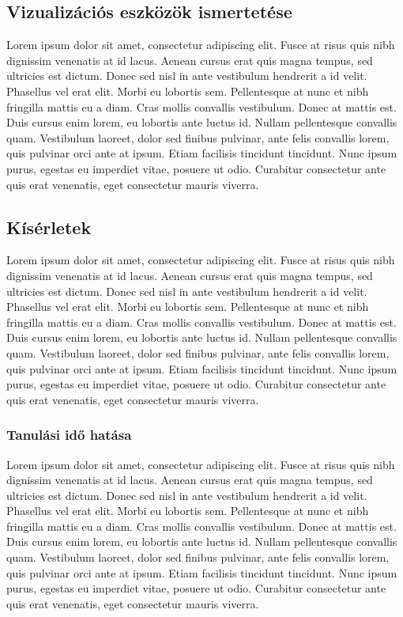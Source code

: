 \documentclass[12pt]{article}
\begin{document}
\subsection{Vizualizációs eszközök ismertetése}

Lorem ipsum dolor sit amet, consectetur adipiscing elit. Fusce at risus quis nibh dignissim venenatis at id lacus. Aenean cursus erat quis magna tempus, sed ultricies est dictum. Donec sed nisl in ante vestibulum hendrerit a id velit. Phasellus vel erat elit. Morbi eu lobortis sem. Pellentesque at nunc et nibh fringilla mattis eu a diam. Cras mollis convallis vestibulum. Donec at mattis est. Duis cursus enim lorem, eu lobortis ante luctus id. Nullam pellentesque convallis quam. Vestibulum laoreet, dolor sed finibus pulvinar, ante felis convallis lorem, quis pulvinar orci ante at ipsum. Etiam facilisis tincidunt tincidunt. Nunc ipsum purus, egestas eu imperdiet vitae, posuere ut odio. Curabitur consectetur ante quis erat venenatis, eget consectetur mauris viverra.

\subsection{Kísérletek}

Lorem ipsum dolor sit amet, consectetur adipiscing elit. Fusce at risus quis nibh dignissim venenatis at id lacus. Aenean cursus erat quis magna tempus, sed ultricies est dictum. Donec sed nisl in ante vestibulum hendrerit a id velit. Phasellus vel erat elit. Morbi eu lobortis sem. Pellentesque at nunc et nibh fringilla mattis eu a diam. Cras mollis convallis vestibulum. Donec at mattis est. Duis cursus enim lorem, eu lobortis ante luctus id. Nullam pellentesque convallis quam. Vestibulum laoreet, dolor sed finibus pulvinar, ante felis convallis lorem, quis pulvinar orci ante at ipsum. Etiam facilisis tincidunt tincidunt. Nunc ipsum purus, egestas eu imperdiet vitae, posuere ut odio. Curabitur consectetur ante quis erat venenatis, eget consectetur mauris viverra.

\subsubsection{Tanulási idő hatása}

Lorem ipsum dolor sit amet, consectetur adipiscing elit. Fusce at risus quis nibh dignissim venenatis at id lacus. Aenean cursus erat quis magna tempus, sed ultricies est dictum. Donec sed nisl in ante vestibulum hendrerit a id velit. Phasellus vel erat elit. Morbi eu lobortis sem. Pellentesque at nunc et nibh fringilla mattis eu a diam. Cras mollis convallis vestibulum. Donec at mattis est. Duis cursus enim lorem, eu lobortis ante luctus id. Nullam pellentesque convallis quam. Vestibulum laoreet, dolor sed finibus pulvinar, ante felis convallis lorem, quis pulvinar orci ante at ipsum. Etiam facilisis tincidunt tincidunt. Nunc ipsum purus, egestas eu imperdiet vitae, posuere ut odio. Curabitur consectetur ante quis erat venenatis, eget consectetur mauris viverra.
\end{document}
